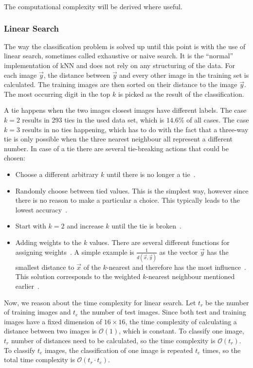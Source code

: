 The computational complexity will be derived where useful.

\subsubsection{Linear Search}
The way the classification problem is solved up until this point is with the use of linear search, sometimes called exhaustive or naive search.
It is the ``normal'' implementation of kNN and does not rely on any structuring of the data.
For each image \(\vec{y}\), the distance between \(\vec{y}\) and every other image in the training set is calculated.
The training images are then sorted on their distance to the image \(\vec{y}\).
The most occurring digit in the top \(k\) is picked as the result of the classification.

A tie happens when the two images closest images have different labels.
The case \(k = 2\) results in 293 ties in the used data set, which is \(14.6\% \) of all cases.
The case \(k = 3\) results in no ties happening, which has to do with the fact that a three-way tie is only possible when the three nearest neighbour all represent a different number.
In case of a tie there are several tie-breaking actions that could be chosen:
\begin{itemize}
    \item Choose a different arbitrary \(k\) until there is no longer a tie~\cite{Pylypiw2017}.
    \item Randomly choose between tied values.
          This is the simplest way, however since there is no reason to make a particular a choice. This typically leads to the lowest accuracy~\cite{Pylypiw2017}.
    \item Start with \(k=2\) and increase \(k\) until the tie is broken~\cite{Pylypiw2017}.
    \item Adding weights to the \(k\) values.
          There are several different functions for assigning weights~\cite{Macleod1987}.
          A simple example is \(\frac{1}{d(\vec{x}, \vec{y})}\) as the vector \(\vec{y}\) has the smallest distance to \(\vec{x}\) of the \(k\)-nearest and therefore has the most influence~\cite{Majewski2012}.
          This solution corresponds to the weighted \(k\)-nearest neighbour mentioned earlier~\cite{Bhatia2010}.
\end{itemize}

Now, we reason about the time complexity for linear search.
Let \(t_r\) be the number of training images and \(t_e\) the number of test images.
Since both test and training images have a fixed dimension of \(16 \times 16\), the time complexity of calculating a distance between two images is \(\mathcal{O}(1)\), which is constant.
To classify one image, \(t_r\) number of distances need to be calculated, so the time complexity is \(\mathcal{O}(t_r)\).
To classify \(t_e\) images, the classification of one image is repeated \(t_e\) times, so the total time complexity is \(\mathcal{O}(t_r \cdot t_e)\).

